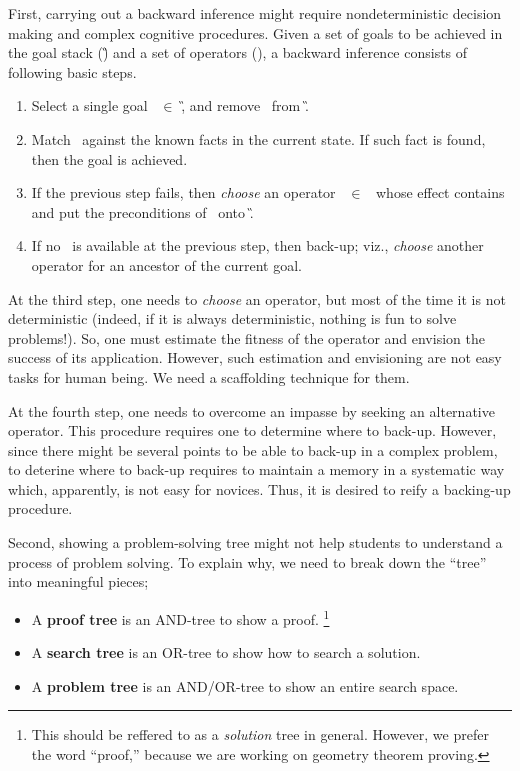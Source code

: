 First, carrying out a backward inference might require nondeterministic
decision making and complex cognitive procedures.  Given a set of goals
to be achieved in the goal stack (\G) and a set of operators (\OP), a
backward inference consists of following basic steps.

\begin{enumerate}
 \item Select a single goal \g\ $\in$ \G, and remove \g\ from \G.
 \item Match \g\ against the known facts in the current state.  If such
       fact is found, then the goal is achieved. 
 \item If the previous step fails, then \textit{choose} an operator \op\
       $\in$ \OP\ whose effect contains \g\, and put the preconditions of
       \op\ onto \G.
 \item If no \op\ is available at the previous step, then back-up; viz.,
       \textit{choose} another operator for an ancestor of the current
       goal.  
\end{enumerate}

At the third step, one needs to \textit{choose} an operator, but most of
the time it is not deterministic (indeed, if it is always deterministic,
nothing is fun to solve problems!).  So, one must estimate the fitness
of the operator and envision the success of its application.  However,
such estimation and envisioning are not easy tasks for human being.  We
need a scaffolding technique for them.  

At the fourth step, one needs to overcome an impasse by seeking an
alternative operator.  This procedure requires one to determine where to
back-up.  However, since there might be several points to be able to
back-up in a complex problem, to deterine where to back-up requires to
maintain a memory in a systematic way which, apparently, is not easy for
novices.  Thus, it is desired to reify a backing-up procedure.

Second, showing a problem-solving tree might not help students to
understand a process of problem solving.  To explain why, we need to
break down the ``tree'' into meaningful pieces;

\begin{itemize}
 \item A \textbf{proof tree} is an AND-tree to show a proof.
       \footnote{This should be reffered to as a \textit{solution} tree
       in general.  However, we prefer the word ``proof,'' because we
       are working on geometry theorem proving.}
 \item A \textbf{search tree} is an OR-tree to show how to search a
       solution.
 \item A \textbf{problem tree} is an AND/OR-tree to show an entire
       search space.
\end{itemize}

